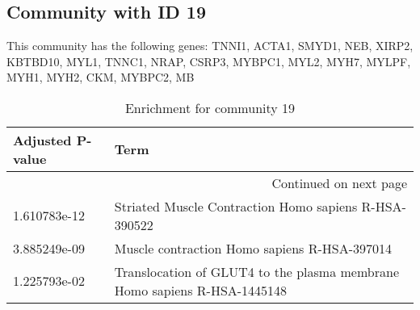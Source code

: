 \subsection*{Community with ID 19}
This community has the following genes: TNNI1, ACTA1, SMYD1, NEB, XIRP2, KBTBD10, MYL1, TNNC1, NRAP, CSRP3, MYBPC1, MYL2, MYH7, MYLPF, MYH1, MYH2, CKM, MYBPC2, MB
\\
\begin{longtable}{p{2.4cm}p{14.5cm}}
\caption{Enrichment for community 19}\\
\toprule
Adjusted \newline P-value &                                                                      Term \\
\midrule
\endhead
\midrule
\multicolumn{2}{r}{{Continued on next page}} \\
\midrule
\endfoot

\bottomrule
\endlastfoot
             1.610783e-12 &                     Striated Muscle Contraction Homo sapiens R-HSA-390522 \\
             3.885249e-09 &                              Muscle contraction Homo sapiens R-HSA-397014 \\
             1.225793e-02 &  Translocation of GLUT4 to the plasma membrane Homo sapiens R-HSA-1445148 \\
\end{longtable}


